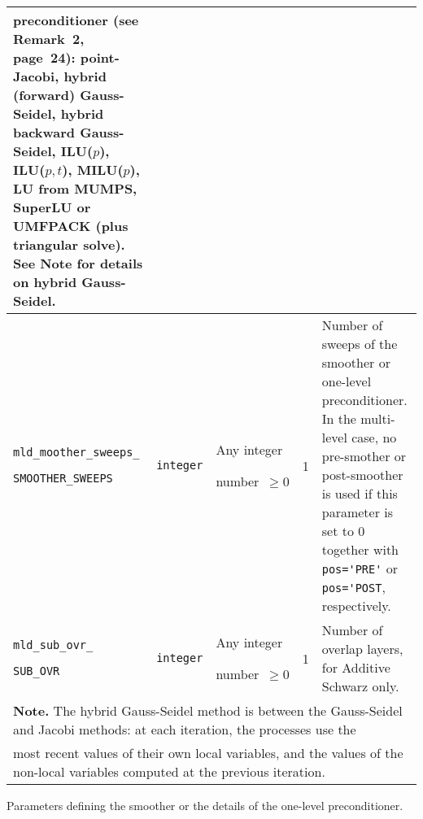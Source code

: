 \begin{center}
\begin{tabular}{|p{3.6cm}|l|p{1.9cm}|p{3.6cm}|p{6.5cm}|}
                            preconditioner (see Remark~2, page~24): point-Jacobi,
                            hybrid (forward) Gauss-Seidel, hybrid backward
                           Gauss-Seidel, ILU($p$),  ILU($p,t$), MILU($p$),
                           LU from MUMPS, SuperLU or UMFPACK
                           (plus triangular solve). See Note for details on hybrid
                           Gauss-Seidel. \\ \hline
\verb|mld_moother_sweeps_| \par \verb|SMOOTHER_SWEEPS|  & \verb|integer|
                         & Any integer \par number~$\ge 0$
                         & 1
                         & Number of sweeps of the smoother or one-level preconditioner.
                            In the multi-level case, no pre-smother or
                            post-smoother is used if this parameter is set to 0 
                            together with \verb|pos='PRE'| or \verb|pos='POST|,
                           respectively. \\ \hline
\verb|mld_sub_ovr_|  \par \verb|SUB_OVR|  & \verb|integer|
                         & Any integer \par number~$\ge 0$
                         & 1
                         & Number of overlap layers, for Additive Schwarz only. \\ \hline
\multicolumn{5}{|l|}{{\bfseries Note.} The hybrid Gauss-Seidel method is
between the Gauss-Seidel and Jacobi methods: at each iteration, the processes use the} \\
\multicolumn{5}{|l|}{most recent values of their own local variables, and the values of
the non-local variables computed at the previous iteration.}\\
\hline
\end{tabular}
\end{center}
\caption{Parameters defining the smoother or the details of the one-level preconditioner.
\label{tab:p_smoother}}  
\esideways

